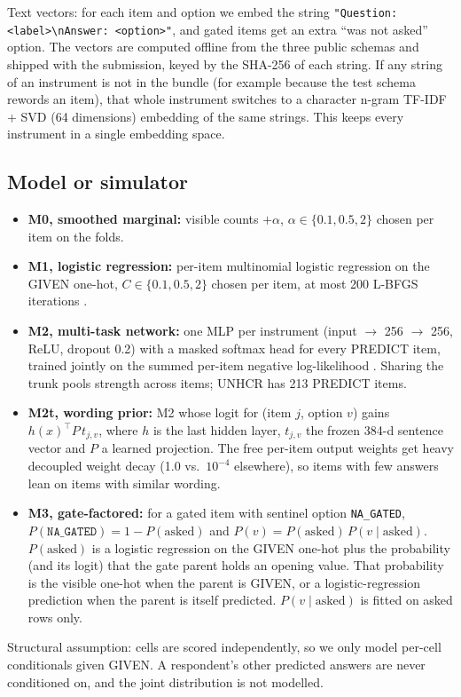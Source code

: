 \documentclass{article}
\begin{document}
Text vectors: for each item and option we embed the string \texttt{"Question: <label>\textbackslash nAnswer: <option>"}, and gated items get an extra ``was not asked'' option. The vectors are computed offline from the three public schemas and shipped with the submission, keyed by the SHA-256 of each string. If any string of an instrument is not in the bundle (for example because the test schema rewords an item), that whole instrument switches to a character n-gram TF-IDF + SVD (64 dimensions) embedding of the same strings. This keeps every instrument in a single embedding space.

\subsection{Model or simulator}
\label{sec:model}
\begin{itemize}[leftmargin=*,itemsep=1pt]
  \item \textbf{M0, smoothed marginal:} visible counts $+\alpha$, $\alpha\in\{0.1,0.5,2\}$ chosen per item on the folds.
  \item \textbf{M1, logistic regression:} per-item multinomial logistic regression on the GIVEN one-hot, $C\in\{0.1,0.5,2\}$ chosen per item, at most 200 L-BFGS iterations \citep{pedregosa2011scikit}.
  \item \textbf{M2, multi-task network:} one MLP per instrument (input $\to$ 256 $\to$ 256, ReLU, dropout 0.2) with a masked softmax head for every PREDICT item, trained jointly on the summed per-item negative log-likelihood \citep{caruana1997multitask}. Sharing the trunk pools strength across items; UNHCR has 213 PREDICT items.
  \item \textbf{M2t, wording prior:} M2 whose logit for (item $j$, option $v$) gains $h(x)^\top P\, t_{j,v}$, where $h$ is the last hidden layer, $t_{j,v}$ the frozen 384-d sentence vector \citep{reimers2019sentence,wang2020minilm} and $P$ a learned projection. The free per-item output weights get heavy decoupled weight decay (1.0 vs.\ $10^{-4}$ elsewhere), so items with few answers lean on items with similar wording.
  \item \textbf{M3, gate-factored:} for a gated item with sentinel option \texttt{NA\_GATED}, $P(\texttt{NA\_GATED})=1-P(\text{asked})$ and $P(v)=P(\text{asked})\,P(v\mid\text{asked})$. $P(\text{asked})$ is a logistic regression on the GIVEN one-hot plus the probability (and its logit) that the gate parent holds an opening value. That probability is the visible one-hot when the parent is GIVEN, or a logistic-regression prediction when the parent is itself predicted. $P(v\mid\text{asked})$ is fitted on asked rows only.
\end{itemize}
Structural assumption: cells are scored independently, so we only model per-cell conditionals given GIVEN. A respondent's other predicted answers are never conditioned on, and the joint distribution is not modelled.
\end{document}
